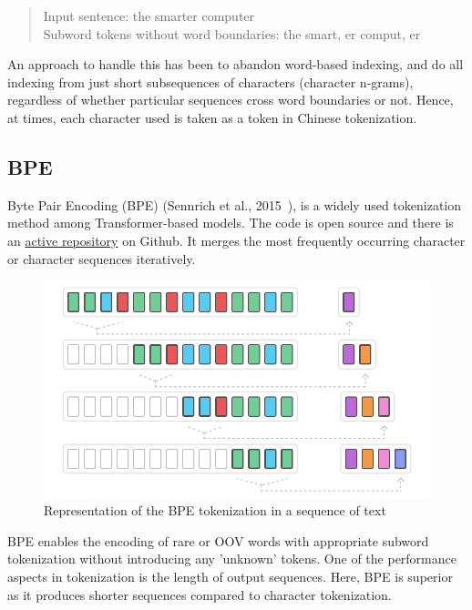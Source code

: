 \begin{quote}
    Input sentence: the smarter computer\\
    Subword tokens without word boundaries: the smart, er comput, er
\end{quote}

An approach to handle this has been to abandon word-based indexing, and do all indexing from just short subsequences of characters (character n-grams), regardless of whether particular sequences cross word boundaries or not. Hence, at times, each character used is taken as a token in Chinese tokenization.

\subsection{BPE}

Byte Pair Encoding (BPE) (Sennrich et al., 2015~\cite{sennrich2015neural}), is a widely used tokenization method among Transformer-based models. The code is open source and there is an \href{https://github.com/rsennrich/subword-nmt}{active repository} on Github. It merges the most frequently occurring character or character sequences iteratively.

\begin{figure}[!ht]
    \centering
    \includegraphics[width=14cm]{figures/bpe.png}
    \caption{Representation of the BPE tokenization in a sequence of text}
\end{figure}

BPE enables the encoding of rare or OOV words with appropriate subword tokenization without introducing any 'unknown' tokens. One of the performance aspects in tokenization is the length of output sequences. Here, BPE is superior as it produces shorter sequences compared to character tokenization.

